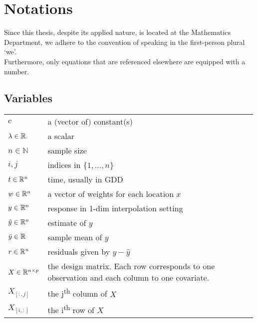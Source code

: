 \chapter*{\vspace{-3.5cm} Notations}
\label{c:Notation}
\vspace{-0.6cm}
Since this thesis, despite its applied nature, is located at the Mathematics Department, we adhere to the convention of speaking in the first-person plural `we'.\\
Furthermore, only equations that are referenced elsewhere are equipped with a number.

\section*{Variables}\vspace{-0.3cm}
\renewcommand{\arraystretch}{1.3} %
\begin{longtable}{p{0.12\linewidth} p{0.87\linewidth}}
$c$		& a (vector of) constant(s)\\
$\lambda \in \mathbb{R}$		& a scalar\\
$n\in \mathbb{N}$		& sample size\\
$i,j$		& indices in $\{1,\dots,n\}$\\
$t\in \mathbb{R}^n$		& time, usually in GDD\\
$w \in \mathbb{R}^n$		& a vector of weights for each location $x$\\
$y\in \mathbb{R}^n$		& response in 1-dim interpolation setting\\
$\hat y\in \mathbb{R}^n$		& estimate of $y$\\
$\bar y\in \mathbb{R}$		& sample mean of $y$\\
$r \in \mathbb{R}^n$		& residuals given by $y - \hat y$\\
$X\in\mathbb{R}^{n\times p}$ & the design matrix. Each row corresponds to one observation and each column to one covariate.\\
$X_{[:,j]}$ 	& the j\textsuperscript{th} column of $X$\\
$X_{[i,:]}$ 	& the i\textsuperscript{th} row of $X$
\end{longtable}

